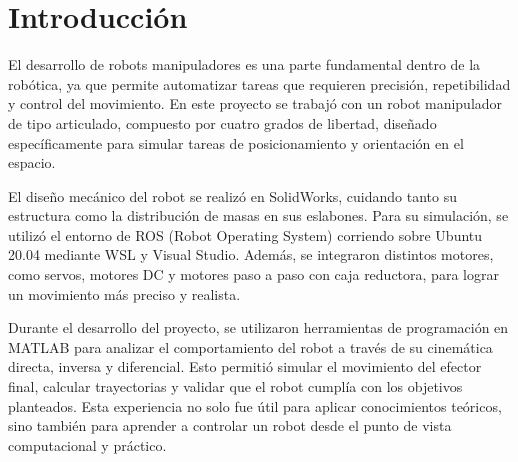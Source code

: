 \chapter{Introducción} \label{chap:introduccion}

El desarrollo de robots manipuladores es una parte fundamental dentro de la robótica, ya que permite automatizar tareas que requieren precisión, repetibilidad y control del movimiento. En este proyecto se trabajó con un robot manipulador de tipo articulado, compuesto por cuatro grados de libertad, diseñado específicamente para simular tareas de posicionamiento y orientación en el espacio.

El diseño mecánico del robot se realizó en SolidWorks, cuidando tanto su estructura como la distribución de masas en sus eslabones. Para su simulación, se utilizó el entorno de ROS (Robot Operating System) corriendo sobre Ubuntu 20.04 mediante WSL y Visual Studio. Además, se integraron distintos motores, como servos, motores DC y motores paso a paso con caja reductora, para lograr un movimiento más preciso y realista.

Durante el desarrollo del proyecto, se utilizaron herramientas de programación en MATLAB para analizar el comportamiento del robot a través de su cinemática directa, inversa y diferencial. Esto permitió simular el movimiento del efector final, calcular trayectorias y validar que el robot cumplía con los objetivos planteados. Esta experiencia no solo fue útil para aplicar conocimientos teóricos, sino también para aprender a controlar un robot desde el punto de vista computacional y práctico.

